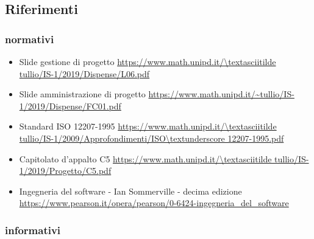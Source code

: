 \documentclass[../norme-di-progetto.tex]{subfiles}
\begin{document}
\subsection{Riferimenti}%
\label{sub:riferimenti}

\subsubsection{normativi}%
\label{subs:normativi}

\begin{itemize}
  \item Slide gestione di progetto
        \newline \url{https://www.math.unipd.it/\textasciitilde tullio/IS-1/2019/Dispense/L06.pdf}
  \item Slide amministrazione di progetto
        \newline \url{https://www.math.unipd.it/~tullio/IS-1/2019/Dispense/FC01.pdf}
  \item Standard ISO 12207-1995
        \newline \url{https://www.math.unipd.it/\textasciitilde tullio/IS-1/2009/Approfondimenti/ISO\textunderscore 12207-1995.pdf}
  \item Capitolato d'appalto C5
        \newline \url{https://www.math.unipd.it/\textasciitilde tullio/IS-1/2019/Progetto/C5.pdf}
  \item Ingegneria del software - Ian Sommerville - decima edizione
        \newline \url{https://www.pearson.it/opera/pearson/0-6424-ingegneria_del_software}
\end{itemize}

\subsubsection{informativi}%
\label{subs:riferimenti informativi}
\end{document}
